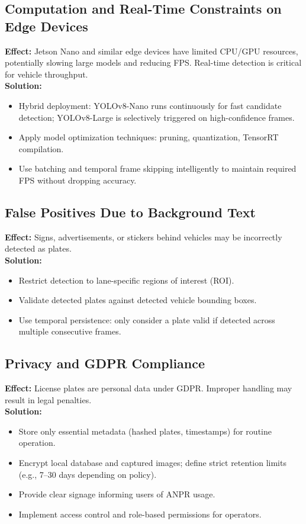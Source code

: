 	\subsection{Computation and Real-Time Constraints on Edge Devices}
	\textbf{Effect:} Jetson Nano and similar edge devices have limited CPU/GPU resources, potentially slowing large models and reducing FPS. Real-time detection is critical for vehicle throughput. \\
	\textbf{Solution:} 
	\begin{itemize}
		\item Hybrid deployment: YOLOv8-Nano runs continuously for fast candidate detection; YOLOv8-Large is selectively triggered on high-confidence frames.
		\item Apply model optimization techniques: pruning, quantization, TensorRT compilation.
		\item Use batching and temporal frame skipping intelligently to maintain required FPS without dropping accuracy.
	\end{itemize}
	
	\subsection{False Positives Due to Background Text}
	\textbf{Effect:} Signs, advertisements, or stickers behind vehicles may be incorrectly detected as plates. \\
	\textbf{Solution:} 
	\begin{itemize}
		\item Restrict detection to lane-specific regions of interest (ROI).
		\item Validate detected plates against detected vehicle bounding boxes.
		\item Use temporal persistence: only consider a plate valid if detected across multiple consecutive frames.
	\end{itemize}
	
	\subsection{Privacy and GDPR Compliance}
	\textbf{Effect:} License plates are personal data under GDPR. Improper handling may result in legal penalties. \\
	\textbf{Solution:} 
	\begin{itemize}
		\item Store only essential metadata (hashed plates, timestamps) for routine operation.
		\item Encrypt local database and captured images; define strict retention limits (e.g., 7–30 days depending on policy).
		\item Provide clear signage informing users of ANPR usage.
		\item Implement access control and role-based permissions for operators.
	\end{itemize}
	
